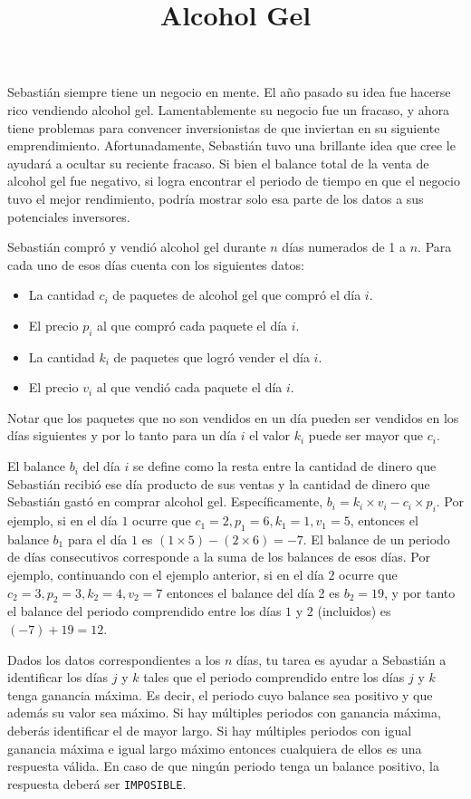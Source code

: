 \documentclass{oci}
\title{Alcohol Gel}
\begin{document}
\begin{problemDescription}
Sebastián siempre tiene un negocio en mente.
El año pasado su idea fue hacerse rico vendiendo alcohol gel.
Lamentablemente su negocio fue un fracaso, y ahora tiene problemas para convencer inversionistas de que
inviertan en su siguiente emprendimiento.
Afortunadamente, Sebastián tuvo una brillante idea que cree le ayudará a ocultar su reciente fracaso.
Si bien el balance total de la venta de alcohol gel fue negativo, si logra encontrar el
periodo de tiempo en que el negocio tuvo el mejor rendimiento, podría mostrar solo esa parte de los
datos a sus potenciales inversores.

Sebastián compró y vendió alcohol gel durante $n$ días numerados de 1 a $n$.
Para cada uno de esos días cuenta con los siguientes datos:
\begin{itemize}
	\item La cantidad $c_i$ de paquetes de alcohol gel que compró el día $i$.
	\item El precio $p_i$ al que compró cada paquete el día $i$.
	\item La cantidad $k_i$ de paquetes que logró vender el día $i$.
	\item El precio $v_i$ al que vendió cada paquete el día $i$.
\end{itemize}
Notar que los paquetes que no son vendidos en un día pueden ser vendidos en los días siguientes y por
lo tanto para un día $i$ el valor $k_i$ puede ser mayor que $c_i$.

El balance $b_i$ del día $i$ se define como la resta entre la cantidad de dinero que Sebastián
recibió ese día producto de sus ventas y la cantidad de dinero que Sebastián gastó en comprar alcohol gel.
Específicamente, $b_i = k_i\times v_i - c_i\times p_i$.
Por ejemplo, si en el día $1$ ocurre que $c_1 = 2, p_1 = 6, k_1=1, v_1=5$, entonces el balance $b_1$
para el día $1$ es $(1 \times 5) - (2 \times 6) = -7$.
El balance de un periodo de días consecutivos corresponde a la suma de los balances de esos días.
Por ejemplo, continuando con el ejemplo anterior, si en el día $2$ ocurre que
$c_2 = 3, p_2 = 3, k_2=4, v_2=7$ entonces el balance del día 2 es $b_2=19$, y por tanto el balance
del periodo comprendido entre los días $1$ y $2$ (incluidos) es $(-7) + 19 = 12$.

Dados los datos correspondientes a los $n$ días, tu tarea es ayudar a Sebastián a identificar los días
$j$ y $k$ tales que el periodo comprendido entre los días $j$ y $k$ tenga ganancia máxima.
Es decir, el periodo cuyo balance sea positivo y que además su valor sea máximo.
Si hay múltiples periodos con ganancia máxima, deberás identificar el de mayor largo.
Si hay múltiples periodos con igual ganancia máxima e igual largo máximo entonces cualquiera de ellos
es una respuesta válida.
En caso de que ningún periodo tenga un balance positivo, la respuesta deberá ser \verb|IMPOSIBLE|.

\end{problemDescription}
\end{document}
